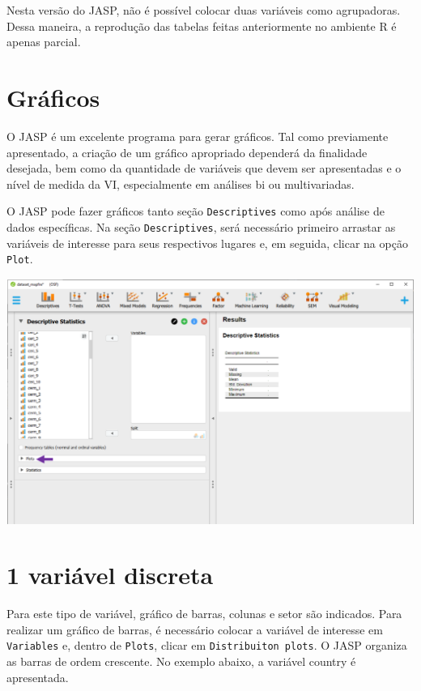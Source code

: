\documentclass[
]{book}
\begin{document}
Nesta versão do JASP, não é possível colocar duas variáveis como agrupadoras. Dessa maneira, a reprodução das tabelas feitas anteriormente no ambiente R é apenas parcial.

\hypertarget{gruxe1ficos-2}{%
\section{Gráficos}\label{gruxe1ficos-2}}

O JASP é um excelente programa para gerar gráficos. Tal como previamente apresentado, a criação de um gráfico apropriado dependerá da finalidade desejada, bem como da quantidade de variáveis que devem ser apresentadas e o nível de medida da VI, especialmente em análises bi ou multivariadas.

O JASP pode fazer gráficos tanto seção \texttt{Descriptives} como após análise de dados específicas. Na seção \texttt{Descriptives}, será necessário primeiro arrastar as variáveis de interesse para seus respectivos lugares e, em seguida, clicar na opção \texttt{Plot}.

\includegraphics{./img/cap_desc_jasp_graficos.png}

\hypertarget{variuxe1vel-discreta-1}{%
\section{1 variável discreta}\label{variuxe1vel-discreta-1}}

Para este tipo de variável, gráfico de barras, colunas e setor são indicados. Para realizar um gráfico de barras, é necessário colocar a variável de interesse em \texttt{Variables} e, dentro de \texttt{Plots}, clicar em \texttt{Distribuiton\ plots}. O JASP organiza as barras de ordem crescente. No exemplo abaixo, a variável country é apresentada.
\end{document}
